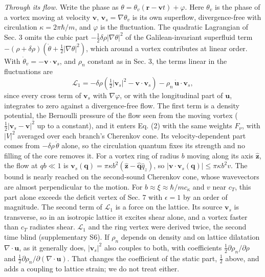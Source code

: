 \documentclass[
  11pt,
]{article}
\begin{document}
\emph{Through its flow.} Write the phase as
\(\theta=\theta_v(\mathbf r-\mathbf vt)+\varphi\). Here \(\theta_v\) is
the phase of a vortex moving at velocity \(\mathbf v\),
\(\mathbf v_s=\nabla\theta_v\) is its own superflow, divergence-free
with circulation \(\kappa=2\pi\hbar/m\), and \(\varphi\) is the
fluctuation. The quadratic Lagrangian of Sec. 3 omits the cubic part
\(-\tfrac12\delta\rho|\nabla\theta|^2\) of the Galilean-invariant
superfluid term
\(-(\rho+\delta\rho)(\dot\theta+\tfrac12|\nabla\theta|^2)\), which
around a vortex contributes at linear order. With
\(\dot\theta_v=-\mathbf v\cdot\mathbf v_s\), and \(\rho_n\) constant as
in Sec. 3, the terms linear in the fluctuations are
\[\mathcal L_1=-\delta\rho\left(\tfrac12|\mathbf v_s|^2-\mathbf v\cdot\mathbf v_s\right)-\rho_n\,\dot{\mathbf u}\cdot\mathbf v_s ,\]
since every cross term of \(\mathbf v_s\) with \(\nabla\varphi\), or
with the longitudinal part of \(\mathbf u\), integrates to zero against
a divergence-free flow. The first term is a density potential, the
Bernoulli pressure of the flow seen from the moving vortex
(\(\tfrac12|\mathbf v_s-\mathbf v|^2\) up to a constant), and it enters
Eq. (2) with the same weights \(F_\nu\), with \(|V|^2\) averaged over
each branch's Cherenkov cone. Its velocity-dependent part comes from
\(-\delta\rho\,\dot\theta\) alone, so the circulation quantum fixes its
strength and no filling of the core removes it. For a vortex ring of
radius \(b\) moving along its axis \(\hat{\mathbf z}\), the flow at
\(qb\ll1\) is
\(\mathbf v_s(\mathbf q)=\pi\kappa b^2(\hat{\mathbf z}-\hat{\mathbf q}\hat q_z)\),
so \(|\mathbf v\cdot\mathbf v_s(\mathbf q)|\le\pi\kappa b^2v\). The
bound is nearly reached on the second-sound Cherenkov cone, whose
wavevectors are almost perpendicular to the motion. For
\(b\approx\xi\approx\hbar/mc_\kappa\) and \(v\) near \(c_T\), this part
alone exceeds the deficit vertex of Sec. 7 with \(\epsilon=1\) by an
order of magnitude. The second term of \(\mathcal L_1\) is a force on
the lattice. Its source \(\mathbf v_s\) is transverse, so in an
isotropic lattice it excites shear alone, and a vortex faster than
\(c_T\) radiates shear. \(\mathcal L_1\) and the ring vertex were
derived twice, the second time blind (supplementary S6). If \(\rho_n\)
depends on density and on lattice dilatation \(\nabla\cdot\mathbf u\),
as it generally does, \(|\mathbf v_s|^2\) also couples to both, with
coefficients \(\tfrac12\partial\rho_n/\partial\rho\) and
\(\tfrac12\partial\rho_n/\partial(\nabla\cdot\mathbf u)\). That changes
the coefficient of the static part, \(\tfrac12\) above, and adds a
coupling to lattice strain; we do not treat either.
\end{document}
